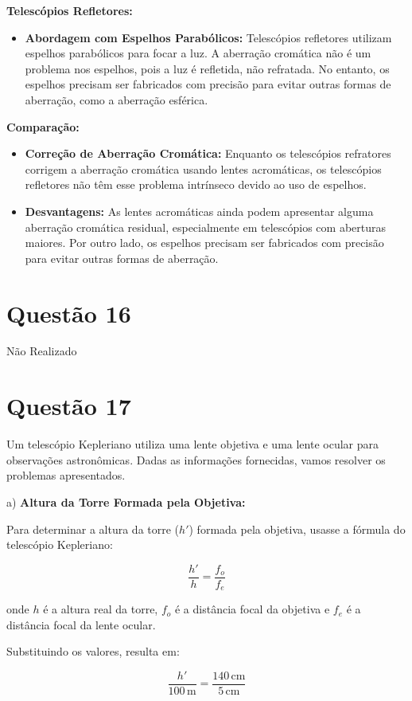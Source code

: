 \documentclass[a4paper, 12pt]{article}
\begin{document}
\textbf{Telescópios Refletores:}
\begin{itemize}
    \item \textbf{Abordagem com Espelhos Parabólicos:} Telescópios refletores utilizam espelhos parabólicos para focar a luz. A aberração cromática não é um problema nos espelhos, pois a luz é refletida, não refratada. No entanto, os espelhos precisam ser fabricados com precisão para evitar outras formas de aberração, como a aberração esférica.
\end{itemize}

\textbf{Comparação:}
\begin{itemize}
    \item \textbf{Correção de Aberração Cromática:} Enquanto os telescópios refratores corrigem a aberração cromática usando lentes acromáticas, os telescópios refletores não têm esse problema intrínseco devido ao uso de espelhos.
    \item \textbf{Desvantagens:} As lentes acromáticas ainda podem apresentar alguma aberração cromática residual, especialmente em telescópios com aberturas maiores. Por outro lado, os espelhos precisam ser fabricados com precisão para evitar outras formas de aberração.
\end{itemize}

\section*{Questão 16}
Não Realizado
\section*{Questão 17}
Um telescópio Kepleriano utiliza uma lente objetiva e uma lente ocular para observações astronômicas. Dadas as informações fornecidas, vamos resolver os problemas apresentados.

a) \textbf{Altura da Torre Formada pela Objetiva:}

Para determinar a altura da torre (\(h'\)) formada pela objetiva, usasse a fórmula do telescópio Kepleriano:

\[
\frac{h'}{h} = \frac{f_o}{f_e}
\]

onde \(h\) é a altura real da torre, \(f_o\) é a distância focal da objetiva e \(f_e\) é a distância focal da lente ocular.

Substituindo os valores, resulta em:

\[
\frac{h'}{100 \, \text{m}} = \frac{140 \, \text{cm}}{5 \, \text{cm}}
\]
\end{document}
